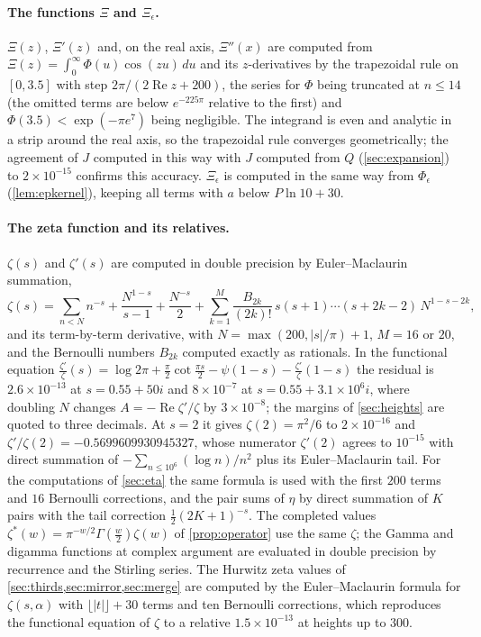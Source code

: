 \documentclass[11pt]{article}
\theoremstyle{definition}\newtheorem{definition}[theorem]{Definition}
\theoremstyle{remark}\newtheorem{remark}[theorem]{Remark}
\renewcommand{\Re}{\operatorname{Re}}\renewcommand{\Im}{\operatorname{Im}}
\begin{document}
\paragraph{The functions $\Xi$ and $\Xi_\epsilon$.} $\Xi(z)$, $\Xi'(z)$ and, on the real axis, $\Xi''(x)$ are computed from $\Xi(z)=\int_0^\infty\Phi(u)\cos(zu)\,du$ and its $z$-derivatives by the trapezoidal rule on $[0,3.5]$ with step $2\pi/(2\Re z+200)$, the series for $\Phi$ being truncated at $n\le14$ (the omitted terms are below $e^{-225\pi}$ relative to the first) and $\Phi(3.5)<\exp(-\pi e^7)$ being negligible. The integrand is even and analytic in a strip around the real axis, so the trapezoidal rule converges geometrically; the agreement of $J$ computed in this way with $J$ computed from $Q$ (\cref{sec:expansion}) to $2\times10^{-15}$ confirms this accuracy. $\Xi_\epsilon$ is computed in the same way from $\Phi_\epsilon$ (\cref{lem:epkernel}), keeping all terms with $a$ below $P\ln10+30$.

\paragraph{The zeta function and its relatives.} $\zeta(s)$ and $\zeta'(s)$ are computed in double precision by Euler--Maclaurin summation,
\[
\zeta(s)=\sum_{n<N}n^{-s}+\frac{N^{1-s}}{s-1}+\frac{N^{-s}}2+\sum_{k=1}^{M}\frac{B_{2k}}{(2k)!}\,s(s+1)\cdots(s+2k-2)\,N^{1-s-2k},
\]
and its term-by-term derivative, with $N=\max(200,|s|/\pi)+1$, $M=16$ or $20$, and the Bernoulli numbers $B_{2k}$ computed exactly as rationals. In the functional equation $\frac{\zeta'}\zeta(s)=\log2\pi+\frac\pi2\cot\frac{\pi s}2-\psi(1-s)-\frac{\zeta'}\zeta(1-s)$ the residual is $2.6\times10^{-13}$ at $s=0.55+50i$ and $8\times10^{-7}$ at $s=0.55+3.1\times10^6i$, where doubling $N$ changes $A=-\Re\zeta'/\zeta$ by $3\times10^{-8}$; the margins of \cref{sec:heights} are quoted to three decimals. At $s=2$ it gives $\zeta(2)=\pi^2/6$ to $2\times10^{-16}$ and $\zeta'/\zeta(2)=-0.5699609930945327$, whose numerator $\zeta'(2)$ agrees to $10^{-15}$ with direct summation of $-\sum_{n\le10^6}(\log n)/n^2$ plus its Euler--Maclaurin tail. For the computations of \cref{sec:eta} the same formula is used with the first $200$ terms and $16$ Bernoulli corrections, and the pair sums of $\eta$ by direct summation of $K$ pairs with the tail correction $\frac12(2K+1)^{-s}$. The completed values $\zeta^*(w)=\pi^{-w/2}\Gamma(\frac w2)\zeta(w)$ of \cref{prop:operator} use the same $\zeta$; the Gamma and digamma functions at complex argument are evaluated in double precision by recurrence and the Stirling series. The Hurwitz zeta values of \cref{sec:thirds,sec:mirror,sec:merge} are computed by the Euler--Maclaurin formula for $\zeta(s,\alpha)$ with $\lfloor|t|\rfloor+30$ terms and ten Bernoulli corrections, which reproduces the functional equation of $\zeta$ to a relative $1.5\times10^{-13}$ at heights up to $300$.
\end{document}
